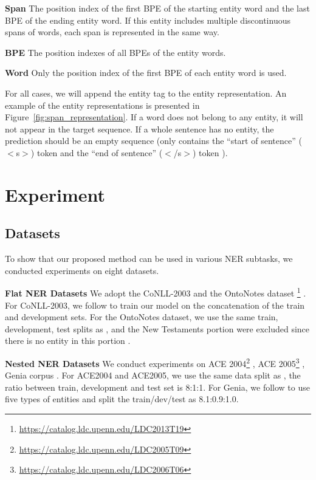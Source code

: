 \documentclass[11pt,a4paper]{article}
\begin{document}
\textbf{Span} The position index of the first BPE of the starting entity word and the last BPE of the ending entity word. If this entity includes multiple discontinuous spans of words, each span is represented in the same way.

\textbf{BPE} The position indexes of all BPEs of the entity words.

\textbf{Word} Only the position index of the first BPE of each entity word is used.

For all cases, we will append the entity tag to the entity representation. An example of the entity representations is presented in Figure~\ref{fig:span_representation}. If a word does not belong to any entity, it will not appear in the target sequence. If a whole sentence has no entity, the prediction should be an empty sequence (only contains the ``start of sentence'' ($<$s$>$) token and the ``end of sentence'' ($<$/s$>$) token ).



\section{Experiment}

\subsection{Datasets}
To show that our proposed method can be used in various NER subtasks, we conducted experiments on eight datasets.

\textbf{Flat NER Datasets} We adopt the CoNLL-2003 \citep{DBLP:conf/conll/SangM03} and the OntoNotes dataset \footnote{\url{https://catalog.ldc.upenn.edu/LDC2013T19}} \citep{DBLP:conf/conll/PradhanMXNBUZZ13}. For CoNLL-2003, we follow \citet{DBLP:conf/naacl/LampleBSKD16,DBLP:conf/acl/YuBP20} to train our model on the concatenation of the train and development sets. For the OntoNotes dataset, we use the same train, development, test splits as \citet{DBLP:conf/conll/PradhanMXUZ12,DBLP:conf/acl/YuBP20}, and the New Testaments portion were excluded since there is no entity in this portion \citep{DBLP:journals/tacl/ChiuN16}.

\textbf{Nested NER Datasets} We conduct experiments on ACE 2004\footnote{\url{https://catalog.ldc.upenn.edu/LDC2005T09}} \citep{DBLP:conf/lrec/DoddingtonMPRSW04}, ACE 2005\footnote{\url{https://catalog.ldc.upenn.edu/LDC2006T06}} \citep{walker2005ace}, Genia corpus \citep{DBLP:conf/ismb/KimOTT03}. For ACE2004 and ACE2005, we use the same data split as \citet{DBLP:conf/emnlp/LuR15,DBLP:conf/emnlp/MuisL17,DBLP:conf/acl/YuBP20}, the ratio between train, development and test set is 8:1:1. For Genia, we follow \citet{DBLP:conf/emnlp/WangLTZ20,DBLP:journals/tacl/ShibuyaH20} to use five types of entities and split the train/dev/test as 8.1:0.9:1.0.
\end{document}
